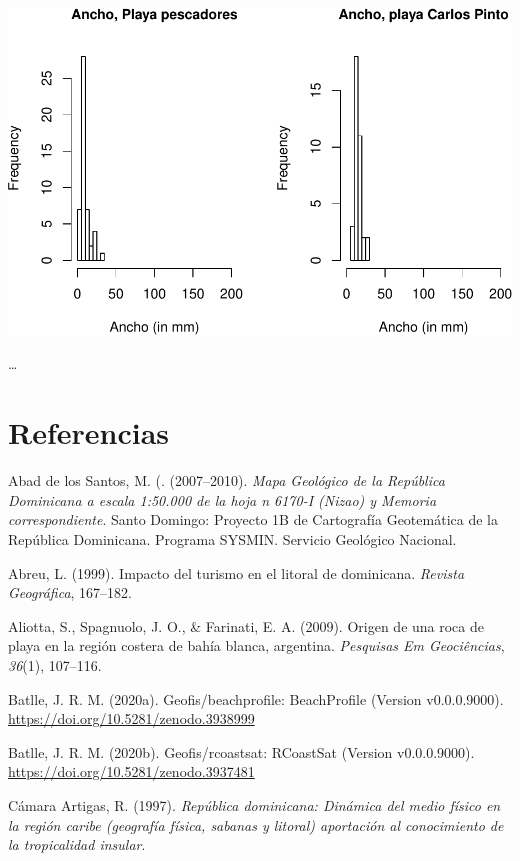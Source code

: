 \documentclass[11pt,]{article}
\begin{document}
\includegraphics{manuscrito_files/figure-latex/unnamed-chunk-6-4.pdf}

\ldots

\section*{Referencias}\label{referencias}

\hypertarget{refs}{}
\hypertarget{ref-abad2007mapageonizao}{}
Abad de los Santos, M. (. (2007--2010). \emph{Mapa Geológico de la
República Dominicana a escala 1:50.000 de la hoja n 6170-I (Nizao) y
Memoria correspondiente}. Santo Domingo: Proyecto 1B de Cartografía
Geotemática de la República Dominicana. Programa SYSMIN. Servicio
Geológico Nacional.

\hypertarget{ref-abreu1999impacto}{}
Abreu, L. (1999). Impacto del turismo en el litoral de dominicana.
\emph{Revista Geográfica}, 167--182.

\hypertarget{ref-aliotta2009origen}{}
Aliotta, S., Spagnuolo, J. O., \& Farinati, E. A. (2009). Origen de una
roca de playa en la región costera de bahía blanca, argentina.
\emph{Pesquisas Em Geociências}, \emph{36}(1), 107--116.

\hypertarget{ref-jose_ramon_martinez_batlle_2020_3938999}{}
Batlle, J. R. M. (2020a). Geofis/beachprofile: BeachProfile (Version
v0.0.0.9000). \url{https://doi.org/10.5281/zenodo.3938999}

\hypertarget{ref-jose_ramon_martinez_batlle_2020_3937481}{}
Batlle, J. R. M. (2020b). Geofis/rcoastsat: RCoastSat (Version
v0.0.0.9000). \url{https://doi.org/10.5281/zenodo.3937481}

\hypertarget{ref-camara1997republica}{}
Cámara Artigas, R. (1997). \emph{República dominicana: Dinámica del
medio físico en la región caribe (geografía física, sabanas y litoral)
aportación al conocimiento de la tropicalidad insular}.
\end{document}
